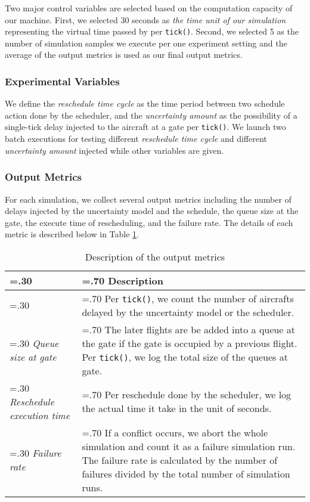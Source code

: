 \documentclass[letterpaper, 10 pt, conference]{ieeeconf}
\newcommand{\inlinecode}{\texttt}
\begin{document}
Two major control variables are selected based on the computation capacity of our machine. First, we selected 30 seconds as {\it the time unit of our simulation}  representing the virtual time passed by per \inlinecode{tick()}. Second, we selected 5 as the number of simulation samples we execute per one experiment setting and the average of the output metrics is used as our final output metrics.


\subsubsection{Experimental Variables}

We define the {\it reschedule time cycle} as the time period between two schedule action done by the scheduler, and the {\it uncertainty amount} as the possibility of a single-tick delay injected to the aircraft at a gate per \inlinecode{tick()}. We launch two batch executions for testing different {\it reschedule time cycle} and different {\it uncertainty amount} injected while other variables are given.

\subsubsection{Output Metrics}

For each simulation, we collect several output metrics including the number of delays injected by the uncertainty model and the schedule, the queue size at the gate, the execute time of rescheduling, and the failure rate. The details of each metric is described below in Table \ref{output-metrics}.

\begin{table}[htbp]
\centering
\begin{tabularx}{\linewidth}{
    |>{\hsize=.30\hsize}X
    |>{\hsize=.70\hsize}X|}
\hline
 & {\bf Description} \\ \hline
{\it Number of delay injected} & Per \inlinecode{tick()}, we count the number of aircrafts delayed by the uncertainty model or the scheduler. \\ \hline
{\it Queue size at gate} & The later flights are be added into a queue at the gate if the gate is occupied by a previous flight. Per \inlinecode{tick()}, we log the total size of the queues at gate. \\ \hline
{\it Reschedule execution time} & Per reschedule done by the scheduler, we log the actual time it take in the unit of seconds. \\ \hline
{\it Failure rate} & If a conflict occurs, we abort the whole simulation and count it as a failure simulation run. The failure rate is calculated by the number of failures divided by the total number of simulation runs. \\ \hline
\end{tabularx}
\label{output-metrics}
\caption{Description of the output metrics}
\end{table}
\end{document}
